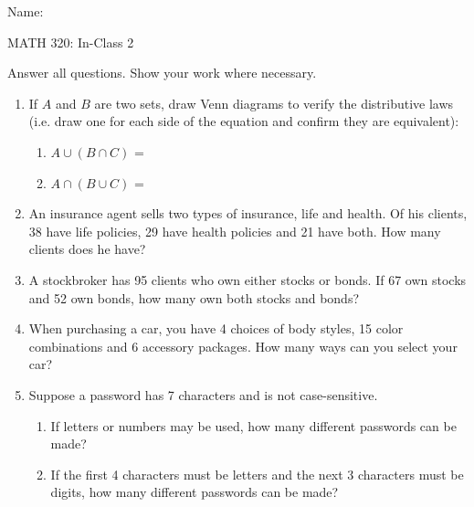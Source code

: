 \documentclass{article}
\begin{document}
\hspace{375pt}Name:

\begin{center}
{\Huge MATH 320: In-Class 2}

\end{center}

\bigskip\bigskip

Answer all questions. Show your work where necessary.\bigskip


\begin{enumerate}
    \item If $A$ and $B$ are two sets, draw Venn diagrams to verify the distributive laws (i.e. draw one for each side of the equation and confirm they are equivalent):%
    \begin{enumerate}
        \item $A \cup (B \cap C)$ = \vspace{60pt}
        \item $A \cap (B \cup C)$ = \vspace{60pt}
    \end{enumerate}\bigskip
    
    \item An insurance agent sells two types of insurance, life and health. Of his clients, 38 have life policies, 29 have health policies and 21 have both. How many clients does he have?\vspace{60pt}%
    
    \item A stockbroker has 95 clients who own either stocks or bonds. If 67 own stocks and 52 own bonds, how many own both stocks and bonds?\vspace{60pt}%

    \item When purchasing a car, you have 4 choices of body styles, 15 color combinations and 6 accessory packages. How many ways can you select your car?\vspace{30pt}%
    
    \item Suppose a password has 7 characters and is not case-sensitive.%
    \begin{enumerate}
        \item If letters or numbers may be used, how many different passwords can be made?\vspace{30pt}
        \item If the first 4 characters must be letters and the next 3 characters must be digits, how many different passwords can be made?\vspace{30pt}
    \end{enumerate}
    

\end{enumerate}
\end{document}
